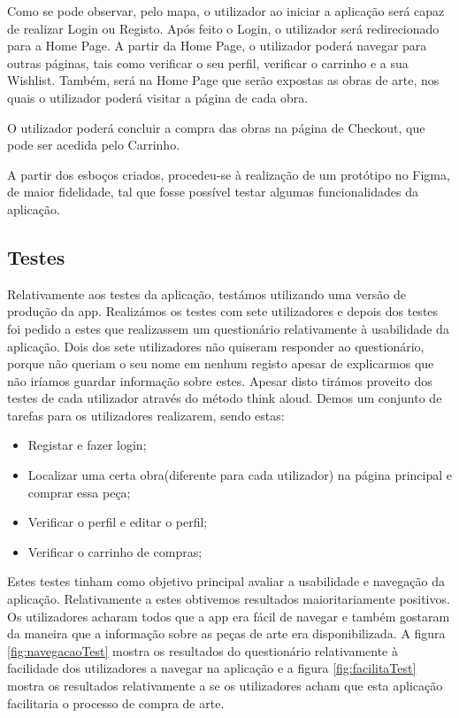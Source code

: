 \documentclass[conference]{IEEEtran}
\begin{document}
Como se pode observar, pelo mapa, o utilizador ao iniciar a aplicação será capaz de realizar Login ou Registo. 
Após feito o Login, o utilizador será redirecionado para a Home Page. A partir da Home Page, o utilizador poderá 
navegar para outras páginas, tais como verificar o seu perfil, verificar o carrinho e a sua Wishlist. Também, 
será na Home Page que serão expostas as obras de arte, nos quais o utilizador poderá visitar a página de cada obra. 

O utilizador poderá concluir a compra das obras na página de Checkout, que pode ser acedida pelo Carrinho.

A partir dos esboços criados, procedeu-se à realização de um protótipo no Figma, de maior fidelidade, tal que 
fosse possível testar algumas funcionalidades da aplicação.

\subsection{Testes}

Relativamente aos testes da aplicação, testámos utilizando uma versão de produção da app. Realizámos os testes com sete utilizadores e depois dos testes foi pedido a estes que realizassem um questionário relativamente à usabilidade da aplicação. Dois dos sete utilizadores não quiseram responder ao questionário, porque não queriam o seu nome em nenhum registo apesar de explicarmos que não iríamos guardar informação sobre estes. Apesar disto tirámos proveito dos testes de cada utilizador através do método think aloud. Demos um conjunto de tarefas para os utilizadores realizarem, sendo estas:

\begin{itemize}
    \item Registar e fazer login;
    \item Localizar uma certa obra(diferente para cada utilizador) na página principal e comprar essa peça;
    \item Verificar o perfil e editar o perfil;
    \item Verificar o carrinho de compras;
\end{itemize}

Estes testes tinham como objetivo principal avaliar a usabilidade e navegação da aplicação. Relativamente a estes obtivemos resultados maioritariamente positivos. Os utilizadores acharam todos que a app era fácil de navegar e também gostaram da maneira que a informação sobre as peças de arte era disponibilizada. A figura
\ref{fig:navegacaoTest}
mostra os resultados do questionário relativamente à facilidade dos utilizadores a navegar na aplicação e a figura
\ref{fig:facilitaTest}
mostra os resultados relativamente a se os utilizadores acham que esta aplicação facilitaria o processo de compra de arte.
\end{document}
